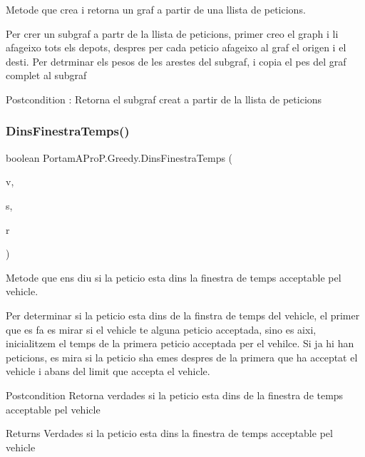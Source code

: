 Metode que crea i retorna un graf a partir de una llista de peticions. 

Per crer un subgraf a partr de la llista de peticions, primer creo el graph i li afageixo tots els depots, despres per cada peticio afageixo al graf el origen i el desti. Per detrminar els pesos de les arestes del subgraf, i copia el pes del graf complet al subgraf

\begin{DoxyPostcond}{Postcondition}
\+: Retorna el subgraf creat a partir de la llista de peticions 
\end{DoxyPostcond}
\mbox{\label{class_portam_a_pro_p_1_1_greedy_adf602e9d56f5dab642b1deb80719d7fa}} 
\subsubsection{\texorpdfstring{Dins\+Finestra\+Temps()}{DinsFinestraTemps()}}
{\footnotesize\ttfamily boolean Portam\+A\+Pro\+P.\+Greedy.\+Dins\+Finestra\+Temps (\begin{DoxyParamCaption}\item[{\hyperlink{class_portam_a_pro_p_1_1_vehicle}{Vehicle}}]{v,  }\item[{\hyperlink{class_portam_a_pro_p_1_1_peticio}{Peticio}}]{s,  }\item[{Tree\+Set$<$ \hyperlink{class_portam_a_pro_p_1_1_peticio}{Peticio} $>$}]{r }\end{DoxyParamCaption})}



Metode que ens diu si la peticio esta dins la finestra de temps acceptable pel vehicle. 

Per determinar si la peticio esta dins de la finstra de temps del vehicle, el primer que es fa es mirar si el vehicle te alguna peticio acceptada, sino es aixi, inicialitzem el temps de la primera peticio acceptada per el vehilce. Si ja hi han peticions, es mira si la peticio s\textquotesingle{}ha emes despres de la primera que ha acceptat el vehicle i abans del limit que accepta el vehicle.

\begin{DoxyPostcond}{Postcondition}
Retorna verdades si la peticio esta dins de la finestra de temps acceptable pel vehicle 
\end{DoxyPostcond}
\begin{DoxyReturn}{Returns}
Verdades si la peticio esta dins la finestra de temps acceptable pel vehicle 
\end{DoxyReturn}
\mbox{\label{class_portam_a_pro_p_1_1_greedy_aee6b3c5abeb729501fdf82a213ad60b5}} 
